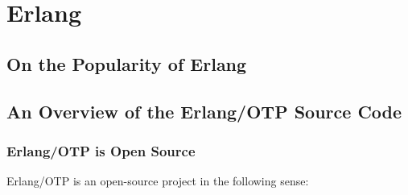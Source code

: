 \chapter{Erlang}
\label{app:erlang}

\section{On the Popularity of Erlang}
\label{app:popularity-of-erlang}

\section{An Overview of the Erlang/OTP Source Code}
\label{app:overview-of-erlang-source}

\subsection{Erlang/OTP is Open Source}

Erlang/OTP is an open-source project in the following sense:


